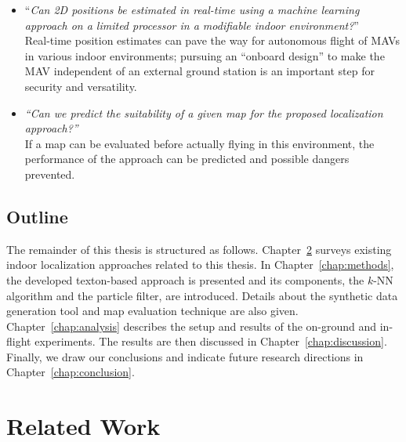 \documentclass{report}
\begin{document}
\begin{itemize}
\item ``\emph{Can 2D positions be estimated in real-time using a
    machine learning approach on a limited processor in a modifiable
    indoor
    environment?}''  \vspace*{0.15cm}\\
  Real-time position estimates can pave the way for autonomous flight
  of MAVs in various indoor environments; pursuing an ``onboard
  design'' to make the MAV independent of an external ground station
  is an important step for security and versatility.
\item \emph{``Can we predict the suitability of a given map for the proposed
  localization approach?''}  \vspace*{0.15cm}\\
  If a map can be evaluated before actually flying in this
  environment, the performance of the approach can be predicted and
  possible dangers prevented.
\end{itemize}

\section{Outline}
\label{sec:outline}

The remainder of this thesis is structured as follows.
Chapter~\ref{chap:relatedwork} surveys existing indoor localization
approaches related to this thesis. In Chapter~\ref{chap:methods}, the
developed texton-based approach is presented and its components, the
$k$-NN algorithm and the particle filter, are introduced. Details about
the synthetic data generation tool and map evaluation technique are
also given. Chapter~\ref{chap:analysis} describes the setup and
results of the on-ground and in-flight experiments. The results are
then discussed in Chapter~\ref{chap:discussion}. Finally, we draw our
conclusions and indicate future research directions in
Chapter~\ref{chap:conclusion}.

\chapter{Related Work}
\label{chap:relatedwork}
\end{document}
